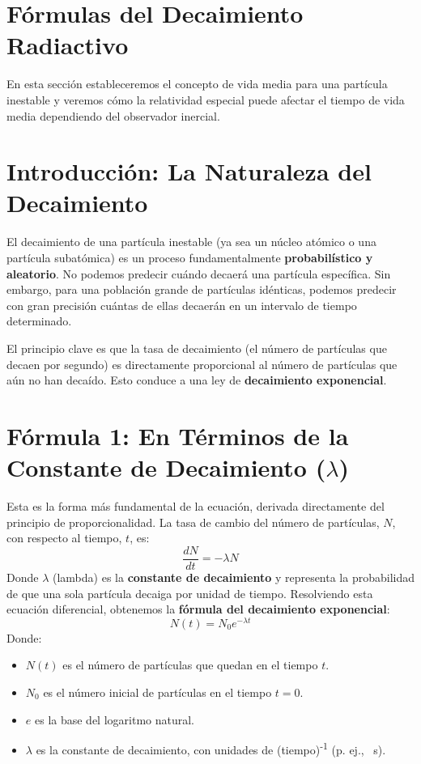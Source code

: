 \documentclass[11pt,a4paper]{book}
\begin{document}

\section{Fórmulas del Decaimiento Radiactivo}
En esta sección estableceremos el concepto de vida media para una partícula inestable y veremos cómo la relatividad especial puede afectar el tiempo de vida media dependiendo del observador inercial.

\section*{Introducción: La Naturaleza del Decaimiento}

El decaimiento de una partícula inestable (ya sea un núcleo atómico o una partícula subatómica) es un proceso fundamentalmente \textbf{probabilístico y aleatorio}. No podemos predecir cuándo decaerá una partícula específica. Sin embargo, para una población grande de partículas idénticas, podemos predecir con gran precisión cuántas de ellas decaerán en un intervalo de tiempo determinado.

El principio clave es que la tasa de decaimiento (el número de partículas que decaen por segundo) es directamente proporcional al número de partículas que aún no han decaído. Esto conduce a una ley de \textbf{decaimiento exponencial}.

\section*{Fórmula 1: En Términos de la Constante de Decaimiento ($\lambda$)}

Esta es la forma más fundamental de la ecuación, derivada directamente del principio de proporcionalidad. La tasa de cambio del número de partículas, $N$, con respecto al tiempo, $t$, es:
\[ \frac{dN}{dt} = -\lambda N \]
Donde $\lambda$ (lambda) es la \textbf{constante de decaimiento} y representa la probabilidad de que una sola partícula decaiga por unidad de tiempo. Resolviendo esta ecuación diferencial, obtenemos la \textbf{fórmula del decaimiento exponencial}:
\[ \boxed{N(t) = N_0 e^{-\lambda t}} \]
Donde:
\begin{itemize}
    \item $N(t)$ es el número de partículas que quedan en el tiempo $t$.
    \item $N_0$ es el número inicial de partículas en el tiempo $t=0$.
    \item $e$ es la base del logaritmo natural.
    \item $\lambda$ es la constante de decaimiento, con unidades de (tiempo)\textsuperscript{-1} (p. ej., \si{\per\second}).
\end{itemize}
\end{document}
